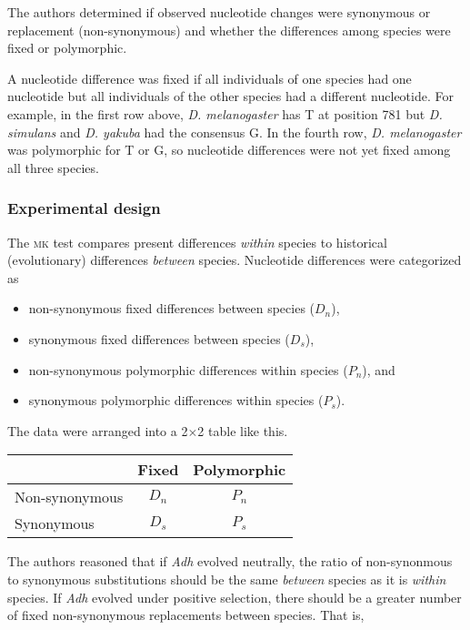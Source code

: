 \documentclass[12pt, addpoints, hidelinks]{exam}
\begin{document}
The authors determined if observed nucleotide changes were synonymous or replacement (non-synonymous) and whether the differences among species were fixed or polymorphic.

A nucleotide difference was fixed if all individuals of one species had one nucleotide but all individuals of the other species had a different nucleotide. For example, in the first row above, \textit{D. melanogaster} has T at position 781 but \textit{D. simulans} and \textit{D. yakuba} had the consensus G.  In the fourth row, \textit{D. melanogaster} was polymorphic for T or G, so nucleotide differences were not yet fixed among all three species.

\subsubsection*{Experimental design}

The \textsc{mk} test compares present differences \emph{within} species to historical (evolutionary) differences \emph{between} species. Nucleotide differences were categorized as 

\begin{itemize}
\item non-synonymous fixed differences between species ($D_n$),
\item synonymous fixed differences between species ($D_s$),
\item non-synonymous polymorphic differences within species ($P_n$), and
\item synonymous polymorphic differences within species ($P_s$).
\end{itemize}

The data were arranged into a 2$\times$2 table like this.

\begin{tabular}{@{}lcc@{}}
\toprule
 & Fixed & Polymorphic \\
\midrule
Non-synonymous	&	$D_n$ 	&	$P_n$ 	\\
Synonymous		&	$D_s$ 	&	$P_s$	\\
\bottomrule
\end{tabular}

The authors reasoned that if \textit{Adh} evolved neutrally,  the ratio of non-synonmous to synonymous substitutions should be the same \emph{between} species as it is \emph{within} species. If \textit{Adh} evolved under positive selection, there should be a greater number of fixed non-synonymous replacements between species. That is,
\end{document}

